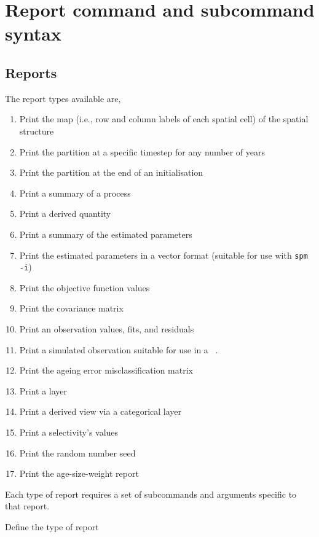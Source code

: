 \section{Report command and subcommand syntax\label{sec:report-syntax}}

\subsection{Reports}

The report types available are,

\begin{enumerate}
  \item Print the map (i.e., row and column labels of each spatial cell) of the spatial structure
  \item Print the partition at a specific timestep for any number of years
  \item Print the partition at the end of an initialisation
  \item Print a summary of a process
  \item Print a derived quantity
  \item Print a summary of the estimated parameters
  \item Print the estimated parameters in a vector format (suitable for use with \texttt{spm -i})
  \item Print the objective function values
  \item Print the covariance matrix
  \item Print an observation values, fits, and residuals
  \item Print a simulated observation suitable for use in a \SPM\ \config.
  \item Print the ageing error misclassification matrix
  \item Print a layer
  \item Print a derived view via a categorical layer
  \item Print a selectivity's values
  \item Print the random number seed
  \item Print the age-size-weight report
\end{enumerate}

Each type of report requires a set of subcommands and arguments specific to that report.


 {Define the type of report}

